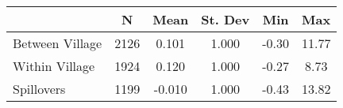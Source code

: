 \begin{tabular}{l*{5}{c}}\hline&\multicolumn{1}{c}{N}&\multicolumn{1}{c}{Mean}&\multicolumn{1}{c}{St. Dev}&\multicolumn{1}{c}{Min}&\multicolumn{1}{c}{Max}\\ \hline 
Between Village & 2126 & 0.101 & 1.000 & -0.30 & 11.77 \\
Within Village & 1924 & 0.120 & 1.000 & -0.27 & 8.73 \\
Spillovers & 1199 & -0.010 & 1.000 & -0.43 & 13.82 \\
\hline \end{tabular}
